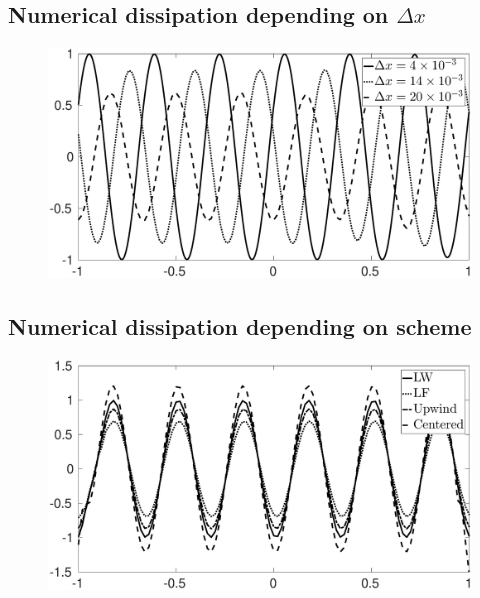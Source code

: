 \documentclass[11pt,letter, swedish, english
]{article}
\newcommand{\Dx}{\ensuremath{\Delta{x}}}
\begin{document}
\subsection{Numerical dissipation depending on $\Dx$}
\begin{figure}
\centering
\includegraphics[width=1\textwidth]{1a.eps}
\caption{}
\label{fig:1a}
\end{figure}

\subsection{Numerical dissipation depending on scheme}
\begin{figure}
\centering
\includegraphics[width=1\textwidth]{1b.eps}
\caption{}
\label{fig:1b}
\end{figure}
\end{document}
